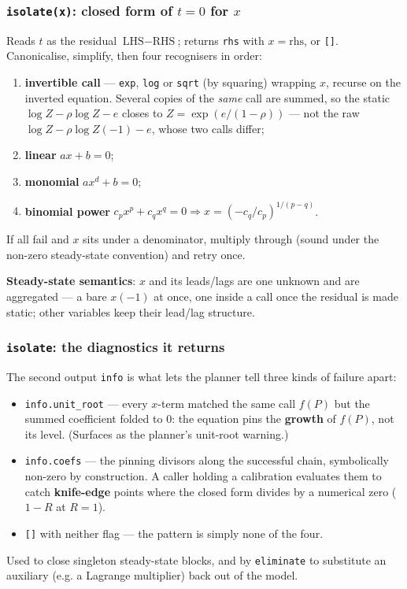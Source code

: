 \documentclass[10pt,slidestop]{beamer}
\newcommand{\code}[1]{\texttt{#1}}
\begin{document}
\begin{frame}\frametitle{\texttt{isolate(x)}: closed form of $t = 0$ for $x$}
  Reads $t$ as the residual $\text{LHS}-\text{RHS}$; returns \code{rhs} with
  $x=\text{rhs}$, or \code{[]}. Canonicalise, simplify, then four recognisers
  in order:

  \begin{enumerate}
  \item \textbf{invertible call} --- \code{exp}, \code{log} or \code{sqrt} (by
    squaring) wrapping $x$, recurse on the inverted equation. Several copies of the
    \emph{same} call are summed, so the static $\log Z - \rho\log Z - e$ closes to
    $Z = \exp(e/(1-\rho))$ --- not the raw $\log Z - \rho\log Z(-1) - e$, whose
    two calls differ;
  \item \textbf{linear} \; $a x + b = 0$;
  \item \textbf{monomial} \; $a x^d + b = 0$;
  \item \textbf{binomial power} \; $c_p x^p + c_q x^q = 0 \Rightarrow
    x=(-c_q/c_p)^{1/(p-q)}$.
  \end{enumerate}

  \smallskip
  If all fail and $x$ sits under a denominator, multiply through (sound under the
  non-zero steady-state convention) and retry once.

  \smallskip
  \textbf{Steady-state semantics}: $x$ and its leads/lags are one unknown and are
  aggregated --- a bare $x(-1)$ at once, one inside a call once the residual is
  made static; other variables keep their lead/lag structure.
\end{frame}

\begin{frame}\frametitle{\texttt{isolate}: the diagnostics it returns}
  The second output \code{info} is what lets the planner tell three kinds of
  failure apart:

  \begin{itemize}
  \item \code{info.unit\_root} --- every $x$-term matched the same call $f(P)$
    but the summed coefficient folded to $0$: the equation pins the
    \textbf{growth} of $f(P)$, not its level. (Surfaces as the planner's
    unit-root warning.)\newline
  \item \code{info.coefs} --- the pinning divisors along the successful chain,
    symbolically non-zero by construction. A caller holding a calibration
    evaluates them to catch \textbf{knife-edge} points where the closed form
    divides by a numerical zero ($1-R$ at $R=1$).\newline
  \item \code{[]} with neither flag --- the pattern is simply none of the four.
  \end{itemize}

  \smallskip
  Used to close singleton steady-state blocks, and by \code{eliminate} to
  substitute an auxiliary (e.g. a Lagrange multiplier) back out of the model.
\end{frame}
\end{document}
